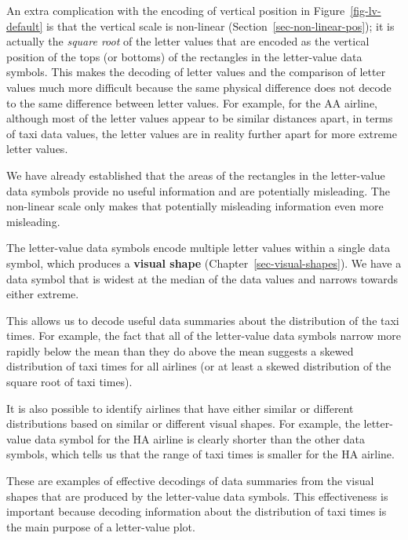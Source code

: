\documentclass[
  letterpaper,
  DIV=11,
  numbers=noendperiod]{scrreprt}
\providecommand{\tightlist}{%
  \setlength{\itemsep}{0pt}\setlength{\parskip}{0pt}}
\begin{document}
\begin{description}
\tightlist
\item[Non-linear scales]
An extra complication with the encoding of vertical position in
Figure~\ref{fig-lv-default} is that the vertical scale is non-linear
(Section~\ref{sec-non-linear-pos}); it is actually the \emph{square
root} of the letter values that are encoded as the vertical position of
the tops (or bottoms) of the rectangles in the letter-value data
symbols. This makes the decoding of letter values and the comparison of
letter values much more difficult because the same physical difference
does not decode to the same difference between letter values. For
example, for the AA airline, although most of the letter values appear
to be similar distances apart, in terms of taxi data values, the letter
values are in reality further apart for more extreme letter values.
\end{description}

We have already established that the areas of the rectangles in the
letter-value data symbols provide no useful information and are
potentially misleading. The non-linear scale only makes that potentially
misleading information even more misleading.

\begin{description}
\tightlist
\item[Visual shapes]
The letter-value data symbols encode multiple letter values within a
single data symbol, which produces a \textbf{visual shape}
(Chapter~\ref{sec-visual-shapes}). We have a data symbol that is widest
at the median of the data values and narrows towards either extreme.
\end{description}

This allows us to decode useful data summaries about the distribution of
the taxi times. For example, the fact that all of the letter-value data
symbols narrow more rapidly below the mean than they do above the mean
suggests a skewed distribution of taxi times for all airlines (or at
least a skewed distribution of the square root of taxi times).

It is also possible to identify airlines that have either similar or
different distributions based on similar or different visual shapes. For
example, the letter-value data symbol for the HA airline is clearly
shorter than the other data symbols, which tells us that the range of
taxi times is smaller for the HA airline.

These are examples of effective decodings of data summaries from the
visual shapes that are produced by the letter-value data symbols. This
effectiveness is important because decoding information about the
distribution of taxi times is the main purpose of a letter-value plot.
\end{document}
